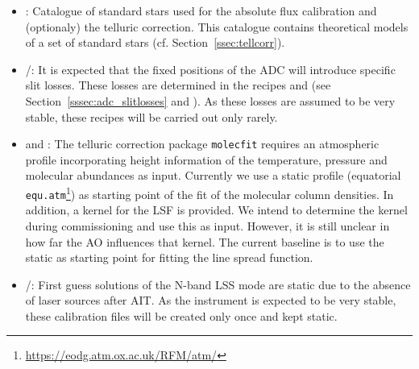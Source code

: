 \begin{itemize}
    \item \hyperref[dataitem:ref_std_cat]{}: Catalogue of standard stars used for the absolute flux calibration and (optionaly) the telluric correction. This catalogue contains theoretical models of a set of standard stars (cf. Section~\ref{ssec:tellcorr}). 
    \item \hyperref[dataitem:lm_adc_slitloss]{}/\hyperref[dataitem:n_adc_slitloss]{}: It is expected that the fixed positions of the \ac{ADC} will introduce specific slit losses. These losses are determined in the recipes \hyperref[rec:metis_lm_adc_slitloss]{} and \hyperref[rec:metis_n_adc_slitloss]{} (see Section~\ref{sssec:adc_slitlosses} and \cite{METIS-calibration_plan}). As these losses are assumed to be very stable, these recipes will be carried out only rarely.
    \item \hyperref[dataitem:atm_profile]{} and \hyperref[dataitem:lsf_kernel]{}: The telluric correction package \texttt{molecfit} requires an atmospheric profile incorporating height information of the temperature, pressure and molecular abundances as input. Currently we use a static profile (equatorial \texttt{equ.atm}\footnote{\url{https://eodg.atm.ox.ac.uk/RFM/atm/}}) as starting point of the fit of the molecular column densities. In addition, a kernel for the \ac{LSF} is provided. We intend to determine the kernel during commissioning and use this as input. However, it is still unclear in how far the \ac{AO} influences that kernel. The current baseline is to use the static \hyperref[dataitem:lsf_kernel]{} as starting point for fitting the line spread function.
    \item \hyperref[dataitem:n_lss_dist_sol]{}/\hyperref[dataitem:n_lss_wave_guess]{}: First guess solutions of the N-band LSS mode are static due to the absence of laser sources after \ac{AIT}. As the instrument is expected to be very stable, these calibration files will be created only once and kept static.
\end{itemize}
